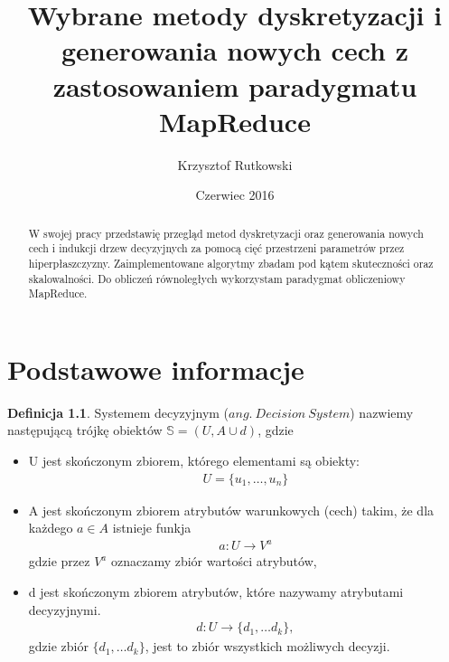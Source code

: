 \documentclass[magisterska]{pracamgr}
\author{Krzysztof Rutkowski}
\title{Wybrane metody dyskretyzacji i generowania nowych cech z zastosowaniem paradygmatu MapReduce}
\date{Czerwiec 2016}
\theoremstyle{plain}
\theoremstyle{definition}
\newtheorem{definicja}[thm]{Definicja}
\theoremstyle{remark}
\begin{document}
\maketitle

\begin{abstract}
W swojej pracy przedstawię przegląd metod dyskretyzacji oraz generowania nowych cech i indukcji drzew decyzyjnych
za pomocą cięć przestrzeni parametrów przez hiperpłaszczyzny. Zaimplementowane algorytmy zbadam pod kątem 
skuteczności oraz skalowalności. Do obliczeń równoległych wykorzystam paradygmat obliczeniowy MapReduce.
\end{abstract}

\tableofcontents


\chapter{Podstawowe informacje}\label{r:pojecia}

\begin{definicja}
Systemem decyzyjnym ($ang. \ Decision \ System$) nazwiemy następującą
trójkę obiektów $\mathbb{S} = (U, A \cup d)$, gdzie
\begin{itemize}
 \item U jest skończonym zbiorem, którego elementami są obiekty:
    \begin{align*}
	    U = \{u_1, \ldots, u_n \}  
    \end{align*}

 \item A jest skończonym zbiorem atrybutów warunkowych (cech) takim, że dla każdego $ a \in A$ istnieje funkja
    \begin{align*}
	  a:U \rightarrow V^{a}
    \end{align*}
    gdzie przez $V^{a}$ oznaczamy zbiór wartości atrybutów,
    
 \item d jest skończonym zbiorem atrybutów, które nazywamy atrybutami decyzyjnymi.
    \begin{align*}
     d: U \rightarrow \{d_1, \ldots d_k\},
    \end{align*}
  gdzie zbiór $\{d_1, \ldots d_k\}$, jest to zbiór wszystkich możliwych decyzji.
\end{itemize}

\end{definicja}
\end{document}
